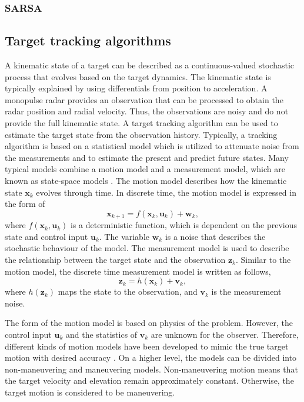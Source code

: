 \documentclass[english, 12pt, a4paper, elec, utf8, a-1b, online]{aaltothesis}
\renewcommand{\vec}[1]{\mathbf{#1}}
\newcommand{\x}{\vec{x}_k}
\newcommand{\xnext}{\vec{x}_{k+1}}
\newcommand{\z}{\vec{z}_k}
\newcommand{\cinput}{\vec{u}_k}
\newcommand{\pnoise}{\vec{w}_k}
\newcommand{\onoise}{\vec{v}_k}
\begin{document}
\subsubsection{SARSA}

\subsection{Target tracking algorithms} \label{sec:Tracking}

A kinematic state of a target can be described as a continuous-valued stochastic process that evolves based on the target dynamics.
The kinematic state is typically explained by using differentials from position to acceleration.
A monopulse radar provides an observation that can be processed to obtain the radar position and radial velocity.
Thus, the observations are noisy and do not provide the full kinematic state.
A target tracking algorithm can be used to estimate the target state from the observation history.
Typically, a tracking algorithm is based on a statistical model which is utilized to attenuate noise from the measurements and to estimate the present and predict future states.
Many typical models combine a motion model and a measurement model, which are known as state-space models \cite{RongLi2003}.
The motion model describes how the kinematic state $\x$ evolves through time.
In discrete time, the motion model is expressed in the form of
\begin{equation}\label{eq:spm_motion}
    \xnext  = f(\x, \cinput) + \pnoise,
\end{equation}
where $f(\x, \cinput)$ is a deterministic function, which is dependent on the previous state and control input $\cinput$. 
The variable $\pnoise$ is a noise that describes the stochastic behaviour of the model.
The measurement model is used to describe the relationship between the target state and the observation $\z$. 
Similar to the motion model, the discrete time measurement model is written as follows,
\begin{equation}\label{eq:spm_obs}
    \z = h(\x) + \onoise,
\end{equation}
where $h(\z)$ maps the state to the observation, and $\onoise$ is the measurement noise.

The form of the motion model is based on physics of the problem. 
However, the control input $\cinput$ and the statistics of $\onoise$ are unknown for the observer.
Therefore, different kinds of motion models have been developed to mimic the true target motion with desired accuracy \cite{RongLi2003}. 
On a higher level, the models can be divided into non-maneuvering and maneuvering models. 
Non-maneuvering motion means that the target velocity and elevation remain approximately constant. 
Otherwise, the target motion is considered to be maneuvering.
\end{document}
